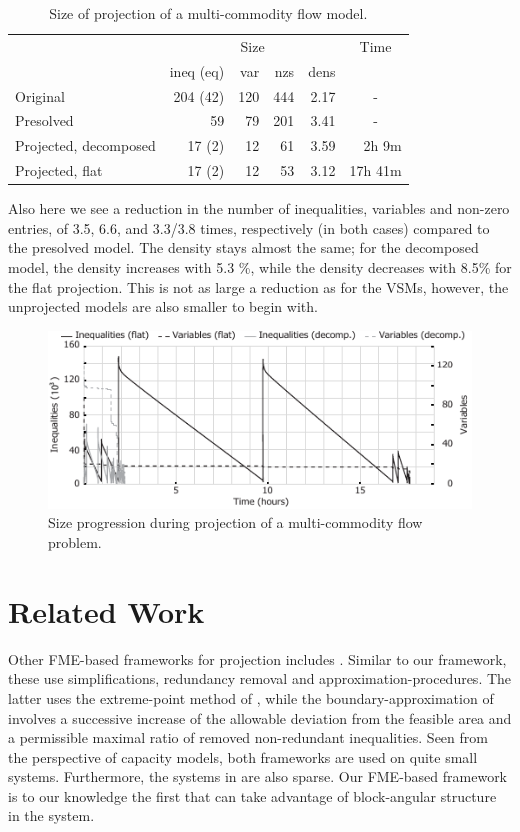 \documentclass{llncs}
\newcommand{\btablesize}{\begin{scriptsize}}
\newcommand{\etablesize}{\end{scriptsize}}
\begin{document}
\begin{table}[tb]
\caption{Size of projection of a multi-commodity flow model.}
\label{tab:multicom}
\centering
\btablesize
\begin{tabular}{l|r@{ / }r@{ / }r@{ / }r|r}
&\multicolumn{4}{c|}{Size}&\multicolumn{1}{c}{Time}\\
											&ineq (eq)&var &nzs &dens&\\
\hline
Original							&204 (42) & 120& 444&2.17&\multicolumn{1}{c}{-}\\
Presolved							& 59		  &  79& 201&3.41&\multicolumn{1}{c}{-}\\
Projected, decomposed	& 17 (2)  &  12&  61&3.59& 2h \phantom{9}9m \\
Projected, flat				& 17 (2)  &  12&  53&3.12& 17h 41m\\
\end{tabular}
\etablesize
\end{table}
Also here we see a reduction in the number of inequalities, variables and non-zero entries, of 3.5, 6.6, and 3.3/3.8 times, respectively (in both cases) compared to the presolved model. The density stays almost the same; for the decomposed model, the density increases with 5.3 \%, while the density decreases with 8.5\% for the flat projection. This is not as large a reduction as for the VSMs, however, the unprojected models are also smaller to begin with. 
\begin{figure}[tb]
	\centering
		\includegraphics{figures/newMultiComGraph2.pdf}
	\caption{Size progression during projection of a multi-commodity flow problem.}
	\label{fig:multicom}
\end{figure}

\section{Related Work} \label{sec:relatedwork}
Other FME-based frameworks for projection includes \cite{simon05,lukatskii08,shapot12}. Similar to our framework, these use simplifications, redundancy removal and approximation-procedures. The latter uses the extreme-point method of \cite{huynh92}, while the boundary-approximation of \cite{lukatskii08,shapot12} involves a successive increase of the allowable deviation from the feasible area and a permissible maximal ratio of removed non-redundant inequalities. Seen from the perspective of capacity models, both frameworks are used on quite small systems. Furthermore, the systems in \cite{simon05} are also sparse. Our FME-based framework is to our knowledge the first that can take advantage of block-angular structure in the system. 
\end{document}
